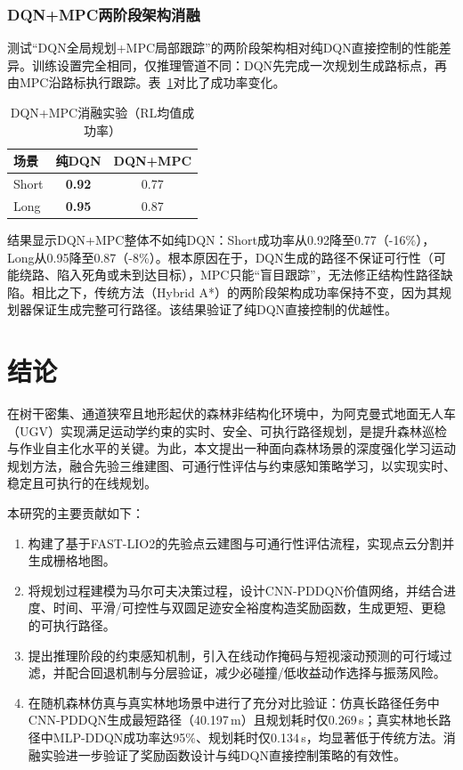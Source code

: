 \documentclass{iopjournal}
\begin{document}
\subsubsection{DQN+MPC两阶段架构消融}

测试``DQN全局规划+MPC局部跟踪''的两阶段架构相对纯DQN直接控制的性能差异。训练设置完全相同，仅推理管道不同：DQN先完成一次规划生成路标点，再由MPC沿路标执行跟踪。表~\ref{tab:ablation_mpc}对比了成功率变化。

\begin{table}[t]
\centering
\caption{DQN+MPC消融实验（RL均值成功率）}
\label{tab:ablation_mpc}
\footnotesize
\begin{tabular}{@{}lcc@{}}
\toprule
\textbf{场景} & \textbf{纯DQN} & \textbf{DQN+MPC} \\
\midrule
Short & \textbf{0.92} & 0.77 \\
Long  & \textbf{0.95} & 0.87 \\
\bottomrule
\end{tabular}
\end{table}

结果显示DQN+MPC整体不如纯DQN：Short成功率从0.92降至0.77（-16\%），Long从0.95降至0.87（-8\%）。根本原因在于，DQN生成的路径不保证可行性（可能绕路、陷入死角或未到达目标），MPC只能``盲目跟踪''，无法修正结构性路径缺陷。相比之下，传统方法（Hybrid A*）的两阶段架构成功率保持不变，因为其规划器保证生成完整可行路径。该结果验证了纯DQN直接控制的优越性。

\section{结论}\label{sec:conclusion}

在树干密集、通道狭窄且地形起伏的森林非结构化环境中，为阿克曼式地面无人车（UGV）实现满足运动学约束的实时、安全、可执行路径规划，是提升森林巡检与作业自主化水平的关键。为此，本文提出一种面向森林场景的深度强化学习运动规划方法，融合先验三维建图、可通行性评估与约束感知策略学习，以实现实时、稳定且可执行的在线规划。

本研究的主要贡献如下：

\begin{enumerate}
  \item 构建了基于FAST-LIO2的先验点云建图与可通行性评估流程，实现点云分割并生成栅格地图。
  \item 将规划过程建模为马尔可夫决策过程，设计CNN-PDDQN价值网络，并结合进度、时间、平滑/可控性与双圆足迹安全裕度构造奖励函数，生成更短、更稳的可执行路径。
  \item 提出推理阶段的约束感知机制，引入在线动作掩码与短视滚动预测的可行域过滤，并配合回退机制与分层验证，减少必碰撞/低收益动作选择与振荡风险。
  \item 在随机森林仿真与真实林地场景中进行了充分对比验证：仿真长路径任务中CNN-PDDQN生成最短路径（40.197\,m）且规划耗时仅0.269\,s；真实林地长路径中MLP-DDQN成功率达95\%、规划耗时仅0.134\,s，均显著低于传统方法。消融实验进一步验证了奖励函数设计与纯DQN直接控制策略的有效性。
\end{enumerate}
\end{document}
